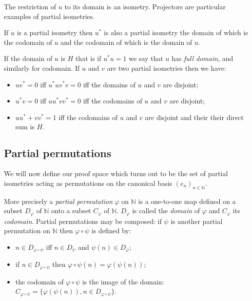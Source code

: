 The restriction of \(u\) to its domain is an isometry. Projectors are
particular examples of partial isometries.

If \(u\) is a partial isometry then \(u^*\) is also a partial isometry
the domain of which is the codomain of \(u\) and the codomain of which
is the domain of \(u\).

If the domain of \(u\) is \(H\) that is if \(u^* u = 1\) we say that
\(u\) has \emph{full domain}, and similarly for codomain. If \(u\) and
\(v\) are two partial isometries then we have:
\begin{itemize}
\item \(uv^* = 0\) iff \(u^*uv^*v = 0\) iff the domains of \(u\) and \(v\)
  are disjoint;
\item \(u^*v = 0\) iff \(uu^*vv^* = 0\) iff the codomains of \(u\) and \(v\)
  are disjoint;
\item \(uu^* + vv^* = 1\) iff the codomains of \(u\) and \(v\) are disjoint
  and their their direct sum is \(H\).
\end{itemize}


\subsection{Partial permutations}\label{partial-permutations}

We will now define our proof space which turns out to be the set of
partial isometries acting as permutations on the canonical basis
\((e_n)_{n\in\mathbb{N}}\).

More precisely a \emph{partial permutation} \(\varphi\) on
\(\mathbb{N}\) is a one-to-one map defined on a subset \(D_\varphi\) of
\(\mathbb{N}\) onto a subset \(C_\varphi\) of \(\mathbb{N}\).
\(D_\varphi\) is called the \emph{domain} of \(\varphi\) and
\(C_\varphi\) its \emph{codomain}. Partial permutations may be composed:
if \(\psi\) is another partial permutation on \(\mathbb{N}\) then
\(\varphi\circ\psi\) is defined by:
\begin{itemize}
\item \(n\in D_{\varphi\circ\psi}\) iff \(n\in D_\psi\) and
  \(\psi(n)\in D_\varphi\);
\item if \(n\in D_{\varphi\circ\psi}\) then
  \(\varphi\circ\psi(n) = \varphi(\psi(n))\);
\item the codomain of \(\varphi\circ\psi\) is the image of the domain:
  \(C_{\varphi\circ\psi} = \{\varphi(\psi(n)), n\in D_{\varphi\circ\psi}\}\).
\end{itemize}

